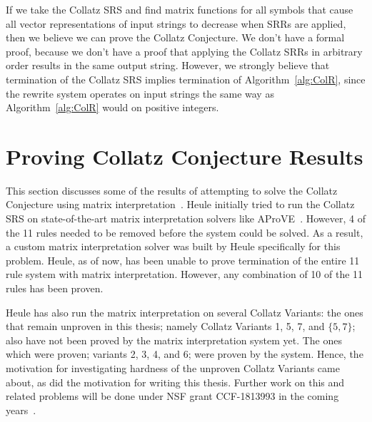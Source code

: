 If we take the Collatz SRS and find matrix functions for all symbols that cause all vector representations of input strings to decrease when SRRs are applied, then we believe we can prove the Collatz Conjecture. We don't have a formal proof, because we don't have a proof that applying the Collatz SRRs in arbitrary order results in the same output string. However, we strongly believe that termination of the Collatz SRS implies termination of Algorithm~\ref{alg:ColR}, since the rewrite system operates on input strings the same way as Algorithm~\ref{alg:ColR} would on positive integers.
\section{Proving Collatz Conjecture Results} \label{subsec:provingCollatzresults}
This section discusses some of the results of attempting to solve the Collatz Conjecture using matrix interpretation~\cite{HeuleAaronson}. Heule initially tried to run the Collatz SRS on state-of-the-art matrix interpretation solvers like AProVE~\cite{Giesletal:2004}. However, 4 of the 11 rules needed to be removed before the system could be solved. As a result, a custom matrix interpretation solver was built by Heule specifically for this problem. Heule, as of now, has been unable to prove termination of the entire 11 rule system with matrix interpretation. However, any combination of 10 of the 11 rules has been proven. \par
Heule has also run the matrix interpretation on several Collatz Variants: the ones that remain unproven in this thesis; namely Collatz Variants 1, 5, 7, and $\{5,7\}$; also have not been proved by the matrix interpretation system yet. The ones which were proven; variants 2, 3, 4, and 6; were proven by the system. Hence, the motivation for investigating hardness of the unproven Collatz Variants came about, as did the motivation for writing this thesis. Further work on this and related problems will be done under NSF grant CCF-1813993 in the coming years~\cite{HeuleAaronsonGrant}.

